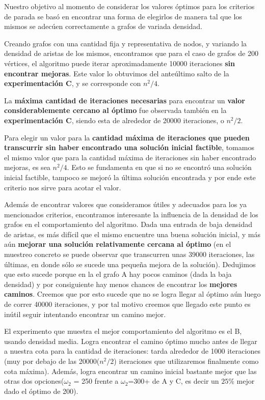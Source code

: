 Nuestro objetivo al momento de considerar los valores óptimos para los criterios de parada se basó en encontrar una forma de elegirlos de manera tal que los mismos se adecúen correctamente a grafos de variada densidad. 

Creando grafos con una cantidad fija y representativa de nodos, y variando la densidad de aristas de los mismos, encontramos que para el caso de grafos de 200 vértices, el algoritmo puede iterar aproximadamente 10000 iteraciones \textbf{sin encontrar mejoras}. Este valor lo obtuvimos del anteúltimo salto de la \textbf{experimentación C}, y se corresponde con $n^2 / 4$.

La \textbf{máxima cantidad de iteraciones necesarias} para encontrar un \textbf{valor considerablemente cercano al óptimo} fue observada también en la \textbf{experimentación C}, siendo esta de alrededor de 20000 iteraciones, o $n^2 / 2$.

Para elegir un valor para la \textbf{cantidad máxima de iteraciones que pueden transcurrir sin haber encontrado una solución inicial factible}, tomamos el mismo valor que para la cantidad máxima de iteraciones sin haber encontrado mejoras, es sea $n^2 / 4$. Esto se fundamenta en que si no se encontró una solución inicial factible, tampoco se mejoró la última solución encontrada y por ende este criterio nos sirve para acotar el valor.

Además de encontrar valores que consideramos útiles y adecuados para los ya mencionados criterios, encontramos interesante la influencia de la densidad de los grafos en el comportamiento del algoritmo. Dada una entrada de baja densidad de aristas, es más difícil que el mismo encuentre una buena solución inicial, y más aún \textbf{mejorar una solución relativamente cercana al óptimo} (en el muestreo concreto se puede observar que transcurren unas 39000 iteraciones, las últimas, en donde sólo se sucede una pequeña mejora de la solución). Dedujimos que esto sucede porque en la el grafo A hay pocos caminos (dada la baja densidad) y por consiguiente hay menos chances de encontrar los \textbf{mejores caminos}. Creemos que por esto sucede que no se logra llegar al óptimo aún luego de correr 40000 iteraciones, y por tal motivo creemos que llegado este punto es inútil seguir intentando encontrar un camino mejor.

El experimento que muestra el mejor comportamiento del algoritmo es el B, usando densidad media. Logra encontrar el camino óptimo mucho antes de llegar a nuestra cota para la cantidad de iteraciones: tarda alrededor de 1000 iteraciones (muy por debajo de las 20000($n^2 / 2$) iteraciones que utilizaremos finalmente como cota máxima). Además, logra encontrar un camino inicial bastante mejor que las otras dos opciones($\omega_2$ = 250 frente a $\omega_2$=300+ de A y C, es decir un $25\%$ mejor dado el óptimo de 200). 

